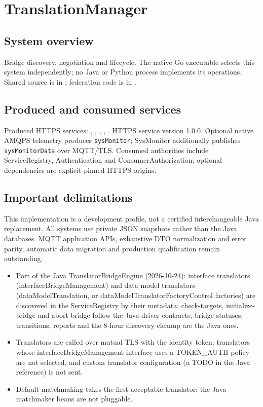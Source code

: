 \documentclass[a4paper]{arrowhead}
\begin{document}
\section{TranslationManager}
\subsection{System overview}
Bridge discovery, negotiation and lifecycle. The native Go executable selects this system independently; no Java or Python process implements its operations. Shared source is in ; federation code is in .
\subsection{Produced and consumed services}
Produced HTTPS services: , \allowbreak {}, \allowbreak {}, \allowbreak {}, \allowbreak {}.
HTTPS service version 1.0.0. Optional native AMQPS telemetry produces \texttt{sysMonitor}; SysMonitor additionally publishes \texttt{sysMonitorData} over MQTT/TLS. Consumed authorities include ServiceRegistry, Authentication and ConsumerAuthorization; optional dependencies are explicit pinned HTTPS origins.
\subsection{Important delimitations}
This implementation is a development profile, not a certified interchangeable Java replacement. All systems use private JSON snapshots rather than the Java databases. MQTT application APIs, exhaustive DTO normalization and error parity, automatic data migration and production qualification remain outstanding.
\begin{itemize}
\item Port of the Java TranslatorBridgeEngine (2026-10-24): interface translators (interfaceBridgeManagement) and data model translators (dataModelTranslation, or dataModelTranslatorFactoryControl factories) are discovered in the ServiceRegistry by their metadata; check-targets, initialize-bridge and abort-bridge follow the Java driver contracts; bridge statuses, transitions, reports and the 8-hour discovery cleanup are the Java ones.
\item Translators are called over mutual TLS with the identity token; translators whose interfaceBridgeManagement interface uses a TOKEN\_AUTH policy are not selected, and custom translator configuration (a TODO in the Java reference) is not sent.
\item Default matchmaking takes the first acceptable translator; the Java matchmaker beans are not pluggable.
\end{itemize}
\end{document}

